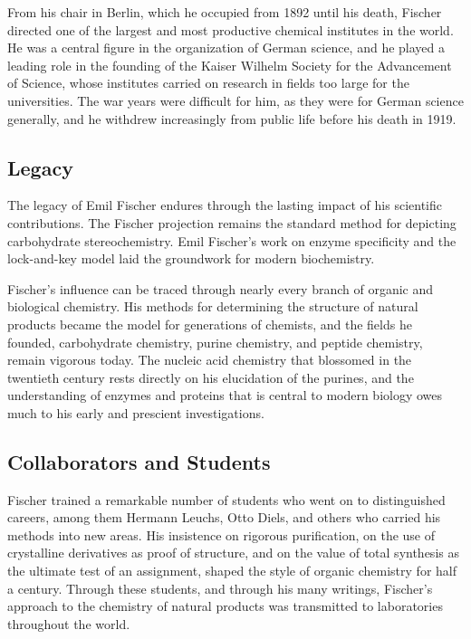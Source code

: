 From his chair in Berlin, which he occupied from 1892 until his death, Fischer directed one of the largest and most productive chemical institutes in the world. He was a central figure in the organization of German science, and he played a leading role in the founding of the Kaiser Wilhelm Society for the Advancement of Science, whose institutes carried on research in fields too large for the universities. The war years were difficult for him, as they were for German science generally, and he withdrew increasingly from public life before his death in 1919.

\subsection*{Legacy}

The legacy of Emil Fischer endures through the lasting impact of his scientific contributions.
The Fischer projection remains the standard method for depicting carbohydrate stereochemistry. Emil Fischer's work on enzyme specificity and the lock-and-key model laid the groundwork for modern biochemistry.

Fischer's influence can be traced through nearly every branch of organic and biological chemistry. His methods for determining the structure of natural products became the model for generations of chemists, and the fields he founded, carbohydrate chemistry, purine chemistry, and peptide chemistry, remain vigorous today. The nucleic acid chemistry that blossomed in the twentieth century rests directly on his elucidation of the purines, and the understanding of enzymes and proteins that is central to modern biology owes much to his early and prescient investigations.

\subsection*{Collaborators and Students}

Fischer trained a remarkable number of students who went on to distinguished careers, among them Hermann Leuchs, Otto Diels, and others who carried his methods into new areas. His insistence on rigorous purification, on the use of crystalline derivatives as proof of structure, and on the value of total synthesis as the ultimate test of an assignment, shaped the style of organic chemistry for half a century. Through these students, and through his many writings, Fischer's approach to the chemistry of natural products was transmitted to laboratories throughout the world.

